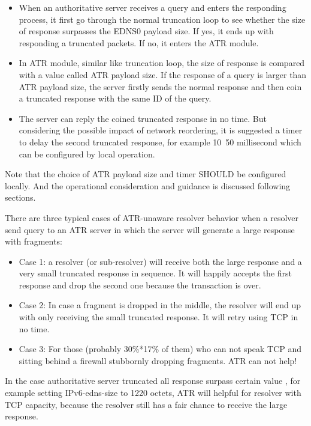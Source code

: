 \begin{itemize}
  \item When an authoritative server receives a query and enters the
      responding process, it first go through the normal truncation loop
      to see whether the size of response surpasses the EDNS0 payload
      size.  If yes, it ends up with responding a truncated packets.  If
      no, it enters the ATR module.
  \item In ATR module, similar like truncation loop, the size of response
      is compared with a value called ATR payload size.  If the response
      of a query is larger than ATR payload size, the server firstly
      sends the normal response and then coin a truncated response with
      the same ID of the query.
  \item The server can reply the coined truncated response in no time.
      But considering the possible impact of network reordering, it is
      suggested a timer to delay the second truncated response, for
      example 10~50 millisecond which can be configured by local
      operation.
\end{itemize}

   Note that the choice of ATR payload size and timer SHOULD be
   configured locally.  And the operational consideration and guidance
   is discussed following sections.

   There are three typical cases of ATR-unaware resolver behavior when a
   resolver send query to an ATR server in which the server will
   generate a large response with fragments:

   \begin{itemize}
  \item Case 1: a resolver (or sub-resolver) will receive both the large
   response and a very small truncated response in sequence.  It will
   happily accepts the first response and drop the second one because
   the transaction is over.
  \item Case 2: In case a fragment is dropped in the middle, the resolver
   will end up with only receiving the small truncated response.  It
   will retry using TCP in no time.
  \item Case 3: For those (probably 30\%*17\% of them) who can not speak TCP
      and sitting behind a firewall stubbornly dropping fragments.  ATR can
      not help!
\end{itemize}

   In the case authoritative server truncated all response surpass
   certain value , for example setting IPv6-edns-size to 1220 octets,
   ATR will helpful for resolver with TCP capacity, because the resolver
   still has a fair chance to receive the large response.


